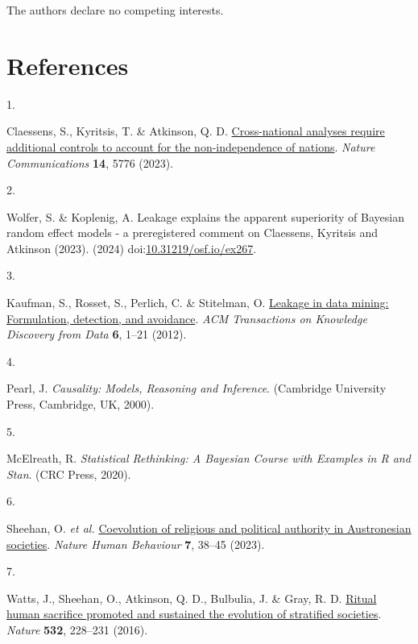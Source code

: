 \documentclass[
  11pt,
]{article}
\newlength{\cslhangindent}
\newlength{\csllabelwidth}
\newlength{\cslentryspacingunit} %
\newenvironment{CSLReferences}[2] %
 {%
  \setlength{\parindent}{0pt}
  \ifodd #1
  \let\oldpar\par
  \def\par{\hangindent=\cslhangindent\oldpar}
  \fi
  \setlength{\parskip}{#2\cslentryspacingunit}
 }%
 {}
\newcommand{\CSLLeftMargin}[1]{\parbox[t]{\csllabelwidth}{#1}}
\newcommand{\CSLRightInline}[1]{\parbox[t]{\linewidth - \csllabelwidth}{#1}\break}
\begin{document}
The authors declare no competing interests.

\hypertarget{references}{%
\section*{References}\label{references}}

\hypertarget{refs}{}
\begin{CSLReferences}{0}{0}
\leavevmode{}%
\CSLLeftMargin{1. }%
\CSLRightInline{Claessens, S., Kyritsis, T. \& Atkinson, Q. D. \href{https://doi.org/10.1038/s41467-023-41486-1}{Cross-national analyses require additional controls to account for the non-independence of nations}. \emph{Nature Communications} \textbf{14}, 5776 (2023).}

\leavevmode{}%
\CSLLeftMargin{2. }%
\CSLRightInline{Wolfer, S. \& Koplenig, A. Leakage explains the apparent superiority of {Bayesian} random effect models - a preregistered comment on {Claessens, Kyritsis and Atkinson (2023)}. (2024) doi:\href{https://doi.org/10.31219/osf.io/ex267}{10.31219/osf.io/ex267}.}

\leavevmode{}%
\CSLLeftMargin{3. }%
\CSLRightInline{Kaufman, S., Rosset, S., Perlich, C. \& Stitelman, O. \href{https://doi.org/10.1145/2382577.2382579}{Leakage in data mining: Formulation, detection, and avoidance}. \emph{ACM Transactions on Knowledge Discovery from Data} \textbf{6}, 1--21 (2012).}

\leavevmode{}%
\CSLLeftMargin{4. }%
\CSLRightInline{Pearl, J. \emph{Causality: Models, Reasoning and Inference}. (Cambridge University Press, Cambridge, UK, 2000).}

\leavevmode{}%
\CSLLeftMargin{5. }%
\CSLRightInline{McElreath, R. \emph{Statistical Rethinking: A {B}ayesian Course with Examples in {R} and {Stan}}. (CRC Press, 2020).}

\leavevmode{}%
\CSLLeftMargin{6. }%
\CSLRightInline{Sheehan, O. \emph{et al.} \href{https://doi.org/10.1038/s41562-022-01471-y}{Coevolution of religious and political authority in {Austronesian} societies}. \emph{Nature Human Behaviour} \textbf{7}, 38--45 (2023).}

\leavevmode{}%
\CSLLeftMargin{7. }%
\CSLRightInline{Watts, J., Sheehan, O., Atkinson, Q. D., Bulbulia, J. \& Gray, R. D. \href{https://doi.org/10.1038/nature17159}{Ritual human sacrifice promoted and sustained the evolution of stratified societies}. \emph{Nature} \textbf{532}, 228--231 (2016).}


\end{CSLReferences}
\end{document}
